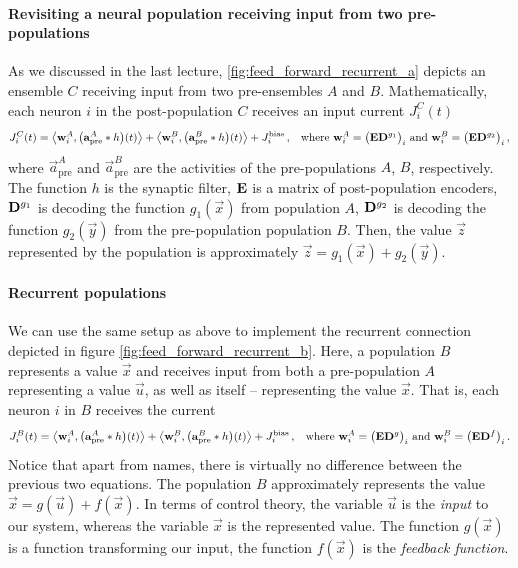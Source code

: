 \documentclass[10pt,letterpaper,oneside]{article}
\begin{document}

\paragraph{Revisiting a neural population receiving input from two pre-populations}
As we discussed in the last lecture, \cref{fig:feed_forward_recurrent_a} depicts an ensemble $C$ receiving input from two pre-ensembles $A$ and $B$. Mathematically, each neuron $i$ in the post-population $C$ receives an input current $J^C_i(t)$
\begin{align*}
	J^C_i(t) &= \big\langle {\mathbf{w}}_i^A , \big ( {\mathbf{a}}^{A}_\mathrm{pre} \ast h \big)(t) \big\rangle
	        + \big\langle {\mathbf{w}}_i^B , \big ( {\mathbf{a}}^{B}_\mathrm{pre} \ast h \big)(t) \big\rangle
	        + J^\mathrm{bias}_i \,,
	       & \text{where } {\mathbf{w}}^A_i = \big( {\mathbf{E}} {\mathbf{D}}^{g_1} \big)_i \text{ and } {\mathbf{w}}^B_i = \big( {\mathbf{E}} {\mathbf{D}}^{g_2} \big)_i \,,
\end{align*}
where $\vec a^{A}_\mathrm{pre}$ and $\vec a^{B}_\mathrm{pre}$ are the activities of the pre-populations $A$, $B$, respectively. The function $h$ is the synaptic filter, ${\mathbf{E}}$ is a matrix of post-population encoders, ${\mathbf{D}}^{g_1}$ is decoding the function $g_1(\vec x)$ from population $A$, ${\mathbf{D}}^{g_2}$ is decoding the function ${g_2}(\vec y)$ from the pre-population population $B$. Then, the value $\vec z$ represented by the population is approximately $\vec z = g_1(\vec x) + g_2(\vec y)$.

\paragraph{Recurrent populations}
We can use the same setup as above to implement the recurrent connection depicted in figure \cref{fig:feed_forward_recurrent_b}. Here, a population $B$ represents a value $\vec x$ and receives input from both a pre-population $A$ representing a value $\vec u$, as well as itself -- representing the value $\vec x$. That is, each neuron $i$ in $B$ receives the current
\begin{align*}
	J^B_i(t) &= \big\langle {\mathbf{w}}_i^A , \big ( {\mathbf{a}}^{A}_\mathrm{pre} \ast h \big)(t) \big\rangle
			+ \big\langle {\mathbf{w}}_i^B , \big ( {\mathbf{a}}^{B}_\mathrm{pre} \ast h \big)(t) \big\rangle
			+ J^\mathrm{bias}_i \,,
			& \text{where } {\mathbf{w}}^A_i = \big( {\mathbf{E}} {\mathbf{D}}^{g} \big)_i \text{ and } {\mathbf{w}}^B_i = \big( {\mathbf{E}} {\mathbf{D}}^{f} \big)_i \,.
\end{align*}
Notice that apart from names, there is virtually no difference between the previous two equations. The population $B$ approximately represents the value $\vec x = g(\vec u) + f(\vec x)$. In terms of control theory, the variable $\vec u$ is the \emph{input} to our system, whereas the variable $\vec x$ is the represented value. The function $g(\vec x)$ is a function transforming our input, the function $f(\vec x)$ is the \emph{feedback function}.
\end{document}
